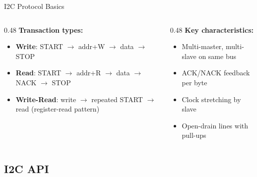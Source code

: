 \documentclass[aspectratio=169, 10pt]{beamer}
\begin{document}
\begin{frame}[fragile]{I2C Protocol Basics}
\vspace{0.3em}
\begin{columns}[T]
\begin{column}{0.48\textwidth}
\textbf{Transaction types:}
\begin{itemize}
  \item \textbf{Write}: START $\rightarrow$ addr+W $\rightarrow$ data $\rightarrow$ STOP
  \item \textbf{Read}: START $\rightarrow$ addr+R $\rightarrow$ data $\rightarrow$ NACK $\rightarrow$ STOP
  \item \textbf{Write-Read}: write $\rightarrow$ repeated START $\rightarrow$ read
        (register-read pattern)
\end{itemize}
\end{column}
\begin{column}{0.48\textwidth}
\textbf{Key characteristics:}
\begin{itemize}
  \item Multi-master, multi-slave on same bus
  \item ACK/NACK feedback per byte
  \item Clock stretching by slave
  \item Open-drain lines with pull-ups
\end{itemize}
\end{column}
\end{columns}
\end{frame}

\subsection{I2C API}
\end{document}
